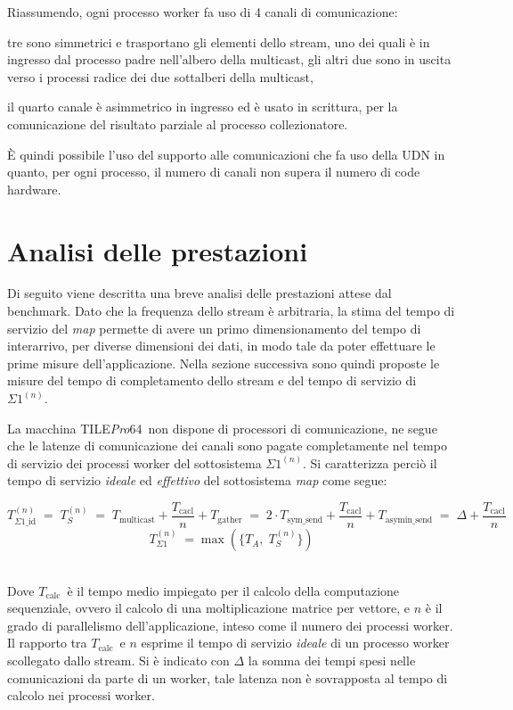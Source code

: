 \documentclass[a4paper]{article}
\newcommand{\subsystem}{$\Sigma1^{(n)}$}
\newcommand{\tile}{TILE\textit{Pro}64}
\newcommand{\Tcalc}{$T_{\textrm{calc}}$}
\begin{document}
Riassumendo, ogni processo worker fa uso di 4 canali di comunicazione: 
\begin{asparaitem}
\item tre sono simmetrici e trasportano gli elementi dello stream, uno dei quali \`e in ingresso dal processo padre nell'albero della multicast, gli altri due sono in uscita verso i processi radice dei due sottalberi della multicast, 
\item il quarto canale \`e asimmetrico in ingresso ed \`e usato in scrittura, per la comunicazione del risultato parziale al processo collezionatore.
\end{asparaitem}
\`E quindi possibile l'uso del supporto alle comunicazioni che fa uso della UDN in quanto, per ogni processo, il numero di canali non supera il numero di code hardware.

\section{Analisi delle prestazioni}
Di seguito viene descritta una breve analisi delle prestazioni attese dal benchmark. Dato che la frequenza dello stream \`e arbitraria, la stima del tempo di servizio del \emph{map} permette di avere un primo dimensionamento del tempo di interarrivo, per diverse dimensioni dei dati, in modo tale da poter effettuare le prime misure dell'applicazione. Nella sezione successiva sono quindi proposte le misure del tempo di completamento dello stream e del tempo di servizio di \subsystem.

La macchina \tile\ non dispone di processori di comunicazione, ne segue che le latenze di comunicazione dei canali sono pagate completamente nel tempo di servizio dei processi worker del sottosistema \subsystem. Si caratterizza perci\`o il tempo di servizio \emph{ideale} ed \emph{effettivo} del sottosistema \emph{map} come segue:
\begin{fleqn}[0pt]
\[ T_{\Sigma1\_\textrm{id}}^{(n)} \; = \; T_S^{(n)} \; = \; T_{\textrm{multicast}} + \frac{T_{\textrm{cacl}}}{n} + T_{\textrm{gather}} \; = \; 2 \cdot T_{\textrm{sym\_send}} + \frac{T_{\textrm{cacl}}}{n} + T_{\textrm{asymin\_send}} \; = \; \Delta + \frac{T_{\textrm{cacl}}}{n} \]
\[ T_{\Sigma1}^{(n)} \; = \max(\{ T_A , \; T_S^{(n)} \}) \]
\end{fleqn}
\\
Dove \Tcalc\ \`e il tempo medio impiegato per il calcolo della computazione sequenziale, ovvero il calcolo di una moltiplicazione matrice per vettore, e $n$ \`e il grado di parallelismo dell'applicazione, inteso come il numero dei processi worker. Il rapporto tra \Tcalc\ e $n$ esprime il tempo di servizio \emph{ideale} di un processo worker scollegato dallo stream. Si \`e indicato con $\Delta$ la somma dei tempi spesi nelle comunicazioni da parte di un worker, tale latenza non \`e sovrapposta al tempo di calcolo nei processi worker. 
\end{document}
